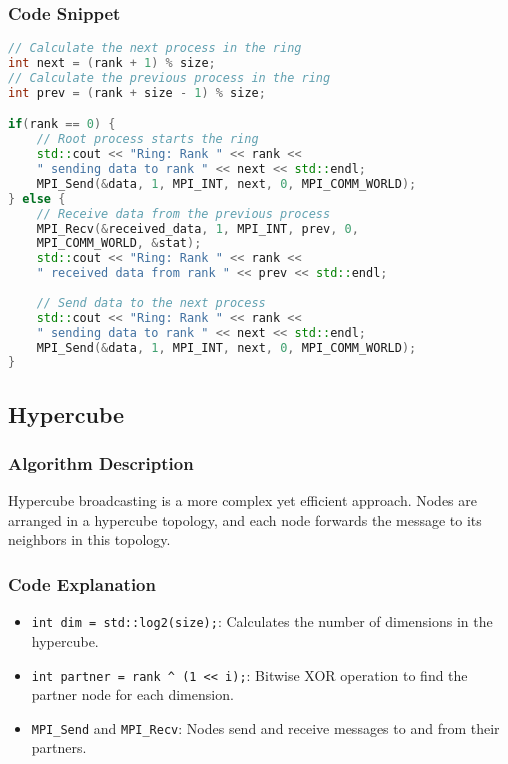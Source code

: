 \documentclass[11pt]{article}
\begin{document}
\subsubsection{Code Snippet}
\begin{lstlisting}[language=C++, caption=Key part of Sequential Ring]
// Calculate the next process in the ring
int next = (rank + 1) % size;  
// Calculate the previous process in the ring
int prev = (rank + size - 1) % size;  

if(rank == 0) {
    // Root process starts the ring
    std::cout << "Ring: Rank " << rank << 
    " sending data to rank " << next << std::endl;
    MPI_Send(&data, 1, MPI_INT, next, 0, MPI_COMM_WORLD);
} else {
    // Receive data from the previous process
    MPI_Recv(&received_data, 1, MPI_INT, prev, 0, 
    MPI_COMM_WORLD, &stat);
    std::cout << "Ring: Rank " << rank << 
    " received data from rank " << prev << std::endl;
        
    // Send data to the next process
    std::cout << "Ring: Rank " << rank << 
    " sending data to rank " << next << std::endl;
    MPI_Send(&data, 1, MPI_INT, next, 0, MPI_COMM_WORLD);
}
\end{lstlisting}

\subsection{Hypercube}

\subsubsection{Algorithm Description}
Hypercube broadcasting is a more complex yet efficient approach. Nodes are arranged in a hypercube topology, and each node forwards the message to its neighbors in this topology.

\subsubsection{Code Explanation}
\begin{itemize}
    \item \texttt{int dim = std::log2(size);}: Calculates the number of dimensions in the hypercube.
    \item \texttt{int partner = rank \^{} (1 << i);}: Bitwise XOR operation to find the partner node for each dimension.
    \item \texttt{MPI\_Send} and \texttt{MPI\_Recv}: Nodes send and receive messages to and from their partners.
\end{itemize}
\end{document}
